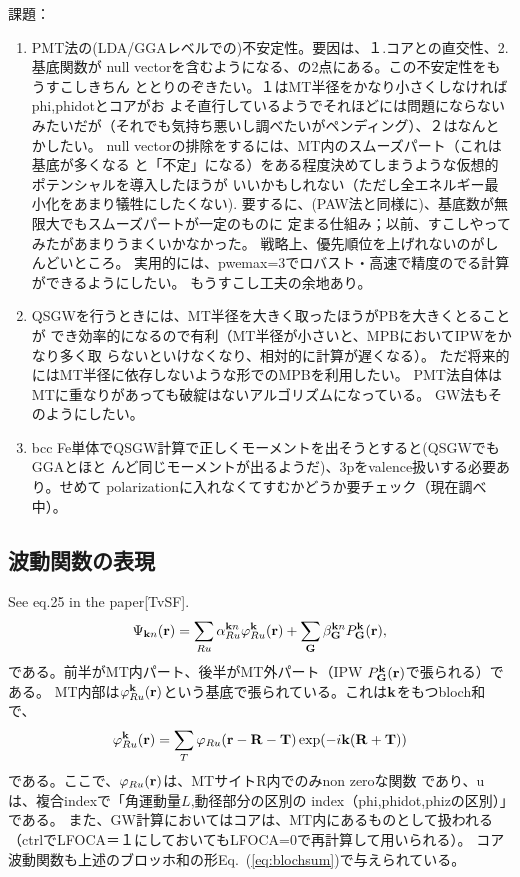 \documentclass[a4paper,10pt,aip,onecolumn,amsmath,amssymb,floatfix,rmp]{revtex4-1}
\newcommand{\bfk}{{\bf k}}
\newcommand{\bfr}{{\bf r}}
\newcommand{\bfT}{{\bf T}}
\newcommand{\bfR}{{\bf R}}
\def\Psikn{\Psi_{{\bf k}n}}
\newcommand{\req}[1]{\mbox{Eq.~\!(\ref{#1})}}
\def\Psikn{{\Psi_{{\bf k}n}}}
\begin{document}
\noindent 課題：
\begin{enumerate}
\item
PMT法の(LDA/GGAレベルでの)不安定性。要因は、１.コアとの直交性、2.基底関数が
null vectorを含むようになる、の2点にある。この不安定性をもうすこしきちん
ととりのぞきたい。１はMT半径をかなり小さくしなければphi,phidotとコアがお
よそ直行しているようでそれほどには問題にならない
みたいだが（それでも気持ち悪いし調べたいがペンディング）、２はなんとかしたい。
null vectorの排除をするには、MT内のスムーズパート（これは基底が多くなる
と「不定」になる）をある程度決めてしまうような仮想的ポテンシャルを導入したほうが
いいかもしれない（ただし全エネルギー最小化をあまり犠牲にしたくない).
要するに、(PAW法と同様に)、基底数が無限大でもスムーズパートが一定のものに
定まる仕組み；以前、すこしやってみたがあまりうまくいかなかった。
戦略上、優先順位を上げれないのがしんどいところ。
実用的には、pwemax=3でロバスト・高速で精度のでる計算ができるようにしたい。
もうすこし工夫の余地あり。
\item 
QSGWを行うときには、MT半径を大きく取ったほうがPBを大きくとることが
でき効率的になるので有利（MT半径が小さいと、MPBにおいてIPWをかなり多く取
らないといけなくなり、相対的に計算が遅くなる）。
ただ将来的にはMT半径に依存しないような形でのMPBを利用したい。
PMT法自体はMTに重なりがあっても破綻はないアルゴリズムになっている。
GW法もそのようにしたい。
\item
bcc Fe単体でQSGW計算で正しくモーメントを出そうとすると(QSGWでもGGAとほと
んど同じモーメントが出るようだ)、3pをvalence扱いする必要あり。せめて
polarizationに入れなくてすむかどうか要チェック（現在調べ中）。
\end{enumerate}


\subsection{波動関数の表現}
See eq.25 in the paper[TvSF].
\begin{eqnarray}
\Psikn(\bfr)
= \sum_{Ru}\alpha^{{\bfk}n}_{Ru} \varphi^{\bf k}_{Ru}({\bfr})
 + \sum_{\bf G}  \beta^{{\bfk}n}_{\bf G} P^{\bf k}_{\bf G}({\bf r}),
\label{def:psiexp}
\end{eqnarray}
である。前半がMT内パート、後半がMT外パート（IPW $P^{\bf k}_{\bf G}({\bf r})$で張られる）である。
MT内部は$\varphi^{\bf k}_{Ru}({\bfr})$という基底で張られている。これは$\bfk$をもつbloch和で、
\begin{eqnarray}
\varphi^{\bfk}_{R u}(\bfr)=
\sum_T \varphi_{Ru}(\bfr-\bfR-\bfT)\exp(-i \bfk(\bfR+\bfT))
\label{eq:blochsum}
\end{eqnarray}
である。ここで、$\varphi_{Ru}(\bfr)$は、MTサイトR内でのみnon zeroな関数
であり、uは、複合indexで「角運動量$L$,動径部分の区別の
index（phi,phidot,phizの区別）」である。
また、GW計算においてはコアは、MT内にあるものとして扱われる（ctrlでLFOCA＝１にしておいてもLFOCA=0で再計算して用いられる）。
コア波動関数も上述のブロッホ和の形\req{eq:blochsum}で与えられている。
\end{document}
